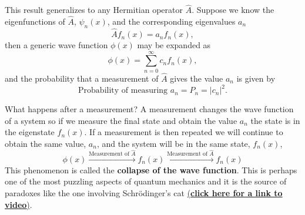 \documentclass[../Main/chem331-notes.tex]{subfiles}
\begin{document}
This result generalizes to any Hermitian operator $\hat{A}$. Suppose we know the eigenfunctions of $\hat{A}$, $\psi_n(x)$, and the corresponding eigenvalues $a_n$
\begin{equation}
\hat{A} f_n(x) = a_n f_n(x),
\end{equation}
then a generic wave function $\phi(x)$ may be expanded as
\begin{equation}
\phi(x) = \sum_{n = 0}^\infty c_n f_n(x),
\end{equation}
 and the probability that a measurement of $\hat{A}$ gives the value $a_n$ is given by
 \begin{equation}
\text{Probability of measuring } a_n = P_n = |c_n|^2.
\end{equation}

What happens after a measurement? A measurement changes the wave function of a system so if we measure the final state and obtain the value $a_n$ the state is in the eigenstate $f_n(x)$.
 If a measurement is then repeated we will continue to obtain the same value, $a_n$, and the system will be in the same state, $f_n(x)$,
\begin{equation}
\phi(x) \xrightarrow{\text{Measurement  of }\hat{A}}{} f_n(x) \xrightarrow{\text{Measurement  of }\hat{A}}{} f_n(x)
\end{equation}
 This phenomenon is called the \textbf{collapse of the wave function}.
This is perhaps one of the most puzzling aspects of quantum mechanics and it is the source of paradoxes like the one involving Schr\"{o}dinger's cat \href{https://ed.ted.com/lessons/schrodinger-s-cat-a-thought-experiment-in-quantum-mechanics-chad-orzel}{(\textbf{click here for a link to video})}.
\end{document}
